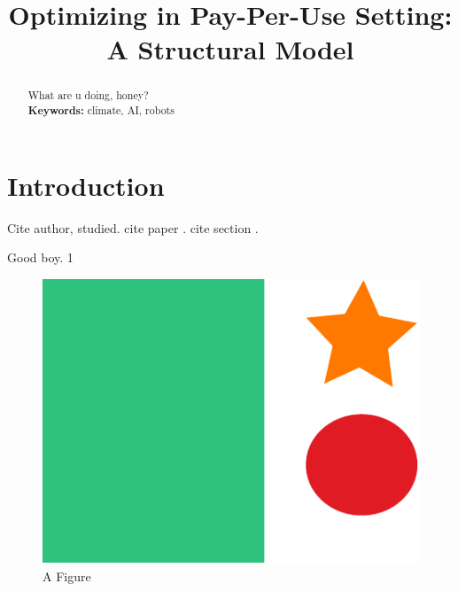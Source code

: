 \documentclass{ssrn}
\title{Optimizing \LaTeXe in Pay-Per-Use Setting: A Structural Model}
\begin{document}
\maketitle
\begin{abstract}
	What are u doing, honey?
	\vspace{1em}\\
	\noindent\textbf{Keywords:} climate, AI, robots\\
	\bigskip
\end{abstract}
\newpage
\section{Introduction}
Cite author, \citet{singh2011} studied. cite paper \citep{singh2011}. cite section \citep[\S 1.1]{singh2011}.

Good boy. 1
\begin{figure}[H]
	\centering
	\includegraphics{figure/plot.pdf}
	\caption{A Figure}
\end{figure}

\newpage
\printbibliography

\newpage
\begin{myappendix}
	
\end{myappendix}
\end{document}
